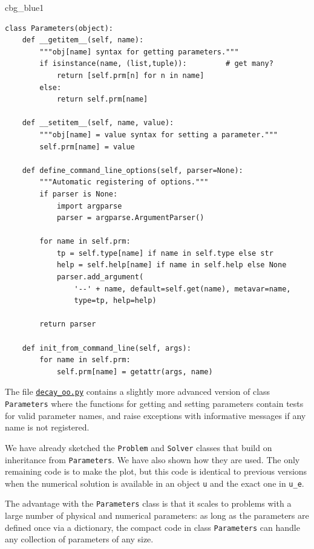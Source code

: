 \documentclass[%
oneside,                 %
final,                   %
10pt]{article}
\newenvironment{_cod_tight}[1]{
   \def\FrameCommand{\colorbox{#1}}
   \FrameRule0.6pt\MakeFramed {\FrameRestore}\vskip3mm}
   {\vskip0mm\endMakeFramed}
\newenvironment{cod}[1]{
\bgroup\rmfamily
\fboxsep=0mm\relax
\begin{_cod_tight}{#1}
\list{}{\parsep=-2mm\parskip=0mm\topsep=0pt\leftmargin=2mm
\rightmargin=2\leftmargin\leftmargin=4pt\relax}
\item\relax}
{\endlist\end{_cod_tight}\egroup}
\begin{document}
\begin{cod}{cbg_blue1}\begin{Verbatim}[numbers=none,fontsize=\fontsize{9pt}{9pt},baselinestretch=0.95,xleftmargin=2mm]
class Parameters(object):
    def __getitem__(self, name):
        """obj[name] syntax for getting parameters."""
        if isinstance(name, (list,tuple)):         # get many?
            return [self.prm[n] for n in name]
        else:
            return self.prm[name]

    def __setitem__(self, name, value):
        """obj[name] = value syntax for setting a parameter."""
        self.prm[name] = value

    def define_command_line_options(self, parser=None):
        """Automatic registering of options."""
        if parser is None:
            import argparse
            parser = argparse.ArgumentParser()

        for name in self.prm:
            tp = self.type[name] if name in self.type else str
            help = self.help[name] if name in self.help else None
            parser.add_argument(
                '--' + name, default=self.get(name), metavar=name,
                type=tp, help=help)

        return parser

    def init_from_command_line(self, args):
        for name in self.prm:
            self.prm[name] = getattr(args, name)
\end{Verbatim}
\end{cod}
\noindent
The file \href{{http://tinyurl.com/ofkw6kc/softeng/decay_oo.py}}{\nolinkurl{decay_oo.py}} contains
a slightly more advanced version of class \texttt{Parameters} where
the functions for getting and setting parameters
contain tests for valid parameter names, and
raise exceptions with informative messages if any name is not registered.

We have already sketched the \texttt{Problem} and \texttt{Solver} classes that build
on inheritance from \texttt{Parameters}. We have also shown how they are
used. The only remaining code is to make the plot, but this code is
identical to previous versions when the numerical solution is
available in an object \texttt{u} and the exact one in \Verb!u_e!.

The advantage with the \texttt{Parameters} class is that it scales to problems
with a large number of physical and numerical parameters:
as long as the parameters are defined once via a dictionary,
the compact code in class \texttt{Parameters} can handle any collection of
parameters of any size.
\end{document}
